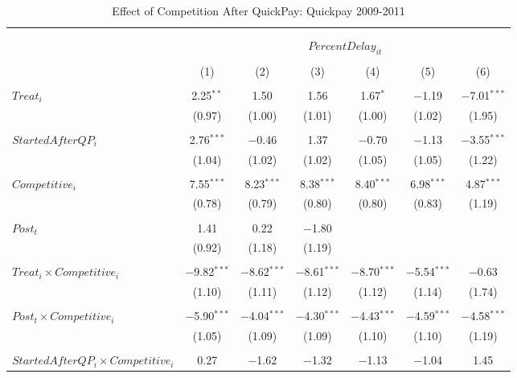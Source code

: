 \documentclass[
]{article}
\begin{document}
\begin{table}[H] \centering 
  \caption{Effect of Competition After QuickPay: Quickpay 2009-2011} 
  \label{} 
\small 
\begin{tabular}{@{\extracolsep{-3pt}}lcccccc} 
\\[-1.8ex]\hline 
\hline \\[-1.8ex] 
\\[-1.8ex] & \multicolumn{6}{c}{$PercentDelay_{it}$  } \\ 
\\[-1.8ex] & (1) & (2) & (3) & (4) & (5) & (6)\\ 
\hline \\[-1.8ex] 
 $Treat_i$ & 2.25$^{**}$ & 1.50 & 1.56 & 1.67$^{*}$ & $-$1.19 & $-$7.01$^{***}$ \\ 
  & (0.97) & (1.00) & (1.01) & (1.00) & (1.02) & (1.95) \\ 
  & & & & & & \\ 
 $StartedAfterQP_i$ & 2.76$^{***}$ & $-$0.46 & 1.37 & $-$0.70 & $-$1.13 & $-$3.55$^{***}$ \\ 
  & (1.04) & (1.02) & (1.02) & (1.05) & (1.05) & (1.22) \\ 
  & & & & & & \\ 
 $Competitive_i$ & 7.55$^{***}$ & 8.23$^{***}$ & 8.38$^{***}$ & 8.40$^{***}$ & 6.98$^{***}$ & 4.87$^{***}$ \\ 
  & (0.78) & (0.79) & (0.80) & (0.80) & (0.83) & (1.19) \\ 
  & & & & & & \\ 
 $Post_t$ & 1.41 & 0.22 & $-$1.80 &  &  &  \\ 
  & (0.92) & (1.18) & (1.19) &  &  &  \\ 
  & & & & & & \\ 
 $Treat_i \times Competitive_i$ & $-$9.82$^{***}$ & $-$8.62$^{***}$ & $-$8.61$^{***}$ & $-$8.70$^{***}$ & $-$5.54$^{***}$ & $-$0.63 \\ 
  & (1.10) & (1.11) & (1.12) & (1.12) & (1.14) & (1.74) \\ 
  & & & & & & \\ 
 $Post_t \times Competitive_i$ & $-$5.90$^{***}$ & $-$4.04$^{***}$ & $-$4.30$^{***}$ & $-$4.43$^{***}$ & $-$4.59$^{***}$ & $-$4.58$^{***}$ \\ 
  & (1.05) & (1.09) & (1.09) & (1.10) & (1.10) & (1.19) \\ 
  & & & & & & \\ 
 $StartedAfterQP_i \times Competitive_i$ & 0.27 & $-$1.62 & $-$1.32 & $-$1.13 & $-$1.04 & 1.45 \\ 

\end{tabular}
\end{table}
\end{document}
